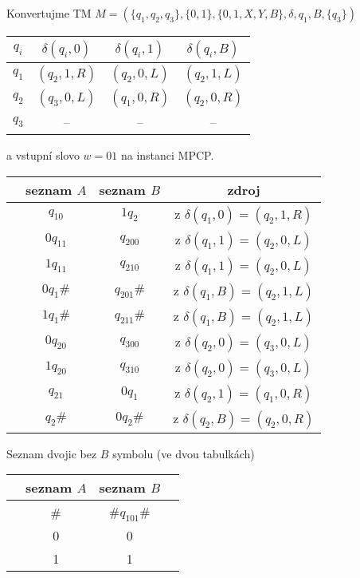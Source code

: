     
    \begin{frame}{}
    \begin{minipage}{0.65\textwidth}
    \begin{example}Konvertujme TM $M=(\{q_1,q_2,q_3\},\{0,1\},\{0,1,X,Y,B\},\delta,q_1,B,\{q_3\})$
    \begin{tabular}{c | c |c| c }
    $q_i$ & $\delta(q_i,0)$ & $\delta(q_i,1)$ & $\delta(q_i,B)$ \\
    \hline 
    $q_1$ & $(q_2,1,R)$& $(q_2,0,L)$&  $(q_2,1,L)$\\
    $q_2$ & $(q_3,0,L)$ & $(q_1,0,R)$& $(q_2,0,R)$\\
    $q_3$ & -- & -- & -- 
    \end{tabular} 
    
    a vstupní slovo $w=01$ na instanci MPCP.
    \end{example}
    \pause
    \begin{tabular}{c  c |c| c }
     & seznam $A$ & seznam $B$ & zdroj\\
    \hline
     & $q_10$ & $1q_2$ & z $\delta(q_1,0)=(q_2,1,R)$ \\
     & $0q_11$ & $q_200$ & z $\delta(q_1,1)=(q_2,0,L)$ \\
     & $1q_11$ & $q_210$ & z $\delta(q_1,1)=(q_2,0,L)$ \\
     & $0q_1\#$ & $q_201\#$ & z $\delta(q_1,B)=(q_2,1,L)$ \\
     & $1q_1\#$ & $q_211\#$ & z $\delta(q_1,B)=(q_2,1,L)$ \\
     & $0q_20$ & $q_300$ & z $\delta(q_2,0)=(q_3,0,L)$ \\
     & $1q_20$ & $q_310$ & z $\delta(q_2,0)=(q_3,0,L)$ \\
     & $q_21$ & $0q_1$ & z $\delta(q_2,1)=(q_1,0,R)$ \\
     & $q_2\#$ & $0q_2\#$ & z $\delta(q_2,B)=(q_2,0,R)$ \\
    \hline
    \end{tabular} 
    \end{minipage}\hfill
    \pause
    \begin{minipage}{0.32\textwidth}
    Seznam dvojic bez $B$ symbolu (ve dvou tabulkách)\\
    \begin{tabular}{c c |c c}
     & seznam $A$ & seznam $B$ & \\
    \hline
    & \# & \#$q_101$\#\\
    & 0 & 0 &\\
    & 1 & 1 &\\

\end{tabular}
\end{minipage}
\end{frame}

